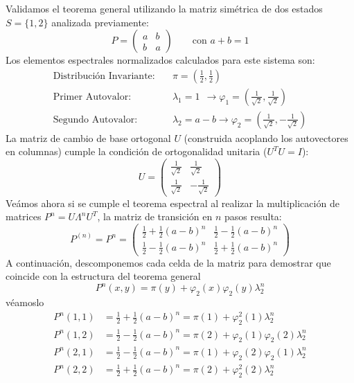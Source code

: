 \begin{ejemplo}
    Validamos el teorema general utilizando la matriz simétrica de dos estados $S = \{1, 2\}$ analizada previamente:
    \[ 
    P = \begin{pmatrix} a & b \\ b & a \end{pmatrix} \qquad \text{con } a+b=1 
    \]
    Los elementos espectrales normalizados calculados para este sistema son:
    \begin{align*}
        \text{Distribución Invariante:} \quad &\pi = \left(\frac{1}{2}, \frac{1}{2}\right) \\[0.2cm]
        \text{Primer Autovalor:} \quad &\lambda_1 = 1 \;\,\longrightarrow \varphi_1 = \left(\frac{1}{\sqrt{2}}, \frac{1}{\sqrt{2}}\right) \\[0.15cm]
        \text{Segundo Autovalor:} \quad &\lambda_2 = a-b \longrightarrow \varphi_2 = \left(\frac{1}{\sqrt{2}}, -\frac{1}{\sqrt{2}}\right)
    \end{align*}
    La matriz de cambio de base ortogonal $U$ (construida acoplando los autovectores en columnas) cumple la condición de ortogonalidad unitaria ($U^T U = I$):
    \[
    U = \begin{pmatrix} \frac{1}{\sqrt{2}} & \frac{1}{\sqrt{2}} \\[0.15cm] \frac{1}{\sqrt{2}} & -\frac{1}{\sqrt{2}} \end{pmatrix}
    \]
    Veámos ahora si se cumple el teorema espectral al realizar la multiplicación de matrices $P^n = U \Lambda^n U^T$, la matriz de transición en $n$ pasos resulta:
    \[
    P^{(n)} = P^n = \begin{pmatrix} \frac{1}{2} + \frac{1}{2}(a-b)^n & \frac{1}{2} - \frac{1}{2}(a-b)^n \\[0.2cm] \frac{1}{2} - \frac{1}{2}(a-b)^n & \frac{1}{2} + \frac{1}{2}(a-b)^n \end{pmatrix}
    \]
    A continuación, descomponemos cada celda de la matriz para demostrar que coincide con la estructura del teorema general 
    $$P^n(x,y) = \pi(y) + \varphi_2(x)\varphi_2(y)\lambda_2^n$$
    véamoslo
    \begin{align*}
        P^n(1,1) &= \frac{1}{2} + \frac{1}{2}(a-b)^n = \pi(1) + \varphi_2^2(1) \lambda_2^n \\[0.2cm]
        P^n(1,2) &= \frac{1}{2} - \frac{1}{2}(a-b)^n = \pi(2) + \varphi_2(1)\varphi_2(2) \lambda_2^n \\[0.2cm]
        P^n(2,1) &= \frac{1}{2} - \frac{1}{2}(a-b)^n = \pi(1) + \varphi_2(2)\varphi_2(1) \lambda_2^n \\[0.2cm]
        P^n(2,2) &= \frac{1}{2} + \frac{1}{2}(a-b)^n = \pi(2) + \varphi_2^2(2) \lambda_2^n
    \end{align*}
\end{ejemplo}


